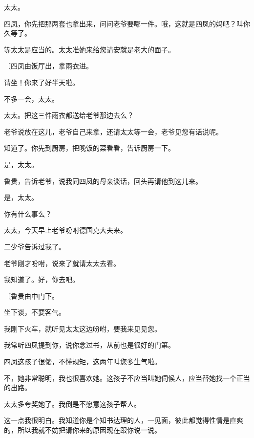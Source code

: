 太太。

四凤，你先把那两套也拿出来，问问老爷要哪一件。哦，这就是四凤的妈吧？叫你久等了。

等太太是应当的。太太准她来给您请安就是老大的面子。

{\fangsong〔四凤由饭厅出，拿雨衣进。}

请坐！你来了好半天啦。

不多一会，太太。

太太。把这三件雨衣都送给老爷那边去么？

老爷说放在这儿，老爷自己来拿，还请太太等一会，老爷见您有话说呢。

知道了。你先到厨房，把晚饭的菜看看，告诉厨房一下。

是，太太。

鲁贵，告诉老爷，说我同四凤的母亲谈话，回头再请他到这儿来。

是，太太。

你有什么事么？

太太，今天早上老爷吩咐德国克大夫来。

二少爷告诉过我了。

老爷刚才吩咐，说来了就请太太去看。

我知道了。好，你去吧。

{\fangsong〔鲁贵由中门下。}

坐下谈，不要客气。

我刚下火车，就听见太太这边吩咐，要我来见见您。

我常听四凤提到你，说你念过书，从前也是很好的门第。

四凤这孩子很傻，不懂规矩，这两年叫您多生气啦。

不，她非常聪明，我也很喜欢她。这孩子不应当叫她伺候人，应当替她找一个正当的出路。

太太多夸奖她了。我倒是不愿意这孩子帮人。

这一点我很明白。我知道你是个知书达理的人，一见面，彼此都觉得性情是直爽的，所以我就不妨把请你来的原因现在跟你说一说。

